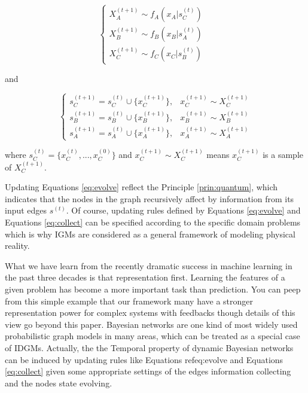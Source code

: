 \documentclass[10pt,onecolumn,letterpaper]{article}
\begin{document}
\begin{CJK*}{UTF8}{gbsn}
\begin{equation} \label{eq:evolve}
\left\{
     \begin{array}{lr}
     X_A^{(t+1)} \sim f_A(x_A|s_{C}^{(t)}) &  \\
     X_B^{(t+1)} \sim f_B(x_B|s_{A}^{(t)}) & \\
     X_C^{(t+1)} \sim f_C(x_C|s_{B}^{(t)}) &  
     \end{array}
\right.
\end{equation}

and 

\begin{equation} \label{eq:collect}
\left\{
     \begin{array}{lr}
     s^{(t+1)}_C = s^{(t)}_C \cup \{x_C^{(t+1)}\}, & x_C^{(t+1)} \sim X_C^{(t+1)} \\
     s^{(t+1)}_B = s^{(t)}_B \cup \{x_B^{(t+1)}\}, & x_B^{(t+1)} \sim X_B^{(t+1)} \\
     s^{(t+1)}_A = s^{(t)}_A \cup \{x_A^{(t+1)}\}, & x_A^{(t+1)} \sim X_A^{(t+1)}  
     \end{array}
\right.
\end{equation}

where $s_{C}^{(t)} = \{x^{(t)}_C, ..., x^{(0)}_C\}$ and $x_C^{(t+1)} \sim X_C^{(t+1)}$ means $x_C^{(t+1)}$ is a sample of $X_C^{(t+1)}$. 

Updating Equations \ref{eq:evolve} reflect the Principle \ref{prin:quantum}, which indicates that the nodes in the graph recursively affect by information from its input edges $s^{(t)}$. Of course, updating rules defined by Equations \ref{eq:evolve} and Equations \ref{eq:collect} can be specified according to the specific domain problems which is why IGMs are considered as a general framework of modeling physical reality. 

What we have learn from the recently dramatic success in machine learning in the past three decades is that representation first. Learning the features of a given problem has become a more important task than prediction. You can peep from this simple example that our framework many have a stronger representation power for complex systems with feedbacks though details of this view go beyond this paper. Bayesian networks are one kind of most widely used probabilistic graph models in many areas, which can be treated as a special case of IDGMs. Actually, the the Temporal property of dynamic Bayesian networks can be induced by updating rules like Equations ref{eq:evolve} and Equations \ref{eq:collect} given some appropriate settings of the edges information collecting and the nodes state evolving.


\end{CJK*}
\end{document}

